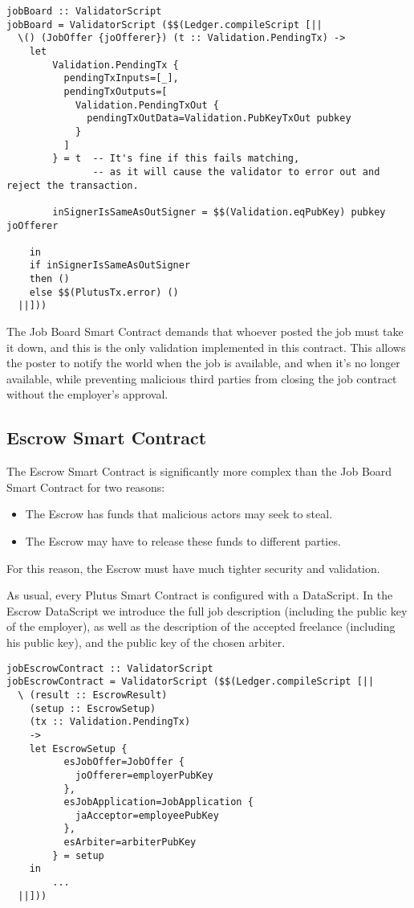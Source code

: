 \documentclass{article}
\begin{document}
\begin{verbatim}
jobBoard :: ValidatorScript
jobBoard = ValidatorScript ($$(Ledger.compileScript [||
  \() (JobOffer {joOfferer}) (t :: Validation.PendingTx) ->
    let
        Validation.PendingTx {
          pendingTxInputs=[_],
          pendingTxOutputs=[
            Validation.PendingTxOut {
              pendingTxOutData=Validation.PubKeyTxOut pubkey
            }
          ]
        } = t  -- It's fine if this fails matching,
               -- as it will cause the validator to error out and reject the transaction.

        inSignerIsSameAsOutSigner = $$(Validation.eqPubKey) pubkey joOfferer

    in
    if inSignerIsSameAsOutSigner
    then ()
    else $$(PlutusTx.error) ()
  ||]))
\end{verbatim}

The Job Board Smart Contract demands that whoever posted the job must take it down, and this is the only validation implemented in this contract. This allows the poster to notify the world when the job is available, and when it's no longer available, while preventing malicious third parties from closing the job contract without the employer's approval.

\subsection{Escrow Smart Contract}
The Escrow Smart Contract is significantly more complex than the Job Board Smart Contract for two reasons:

\begin{itemize}
  \item The Escrow has funds that malicious actors may seek to steal.
  \item The Escrow may have to release these funds to different parties.
\end{itemize}

For this reason, the Escrow must have much tighter security and validation.

As usual, every Plutus Smart Contract is configured with a DataScript. In the Escrow DataScript we introduce the full job description (including the public key of the employer), as well as the description of the accepted freelance (including his public key), and the public key of the chosen arbiter.

\begin{verbatim}
jobEscrowContract :: ValidatorScript
jobEscrowContract = ValidatorScript ($$(Ledger.compileScript [||
  \ (result :: EscrowResult)
    (setup :: EscrowSetup)
    (tx :: Validation.PendingTx)
    ->
    let EscrowSetup {
          esJobOffer=JobOffer {
            joOfferer=employerPubKey
          },
          esJobApplication=JobApplication {
            jaAcceptor=employeePubKey
          },
          esArbiter=arbiterPubKey
        } = setup
    in
		...
  ||]))
\end{verbatim}
\end{document}
